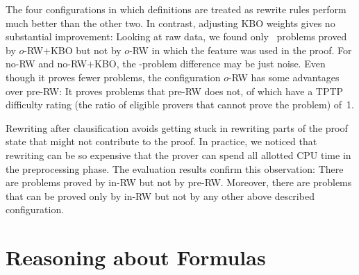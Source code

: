 \newcommand{\unknownres}{\ensuremath{{\varnothing}}}
\newcommand{\colalign}{\phantom{0}}

\begin{figure}[t]
  \centering
  \def\arraystretch{1.1}%
       \label{fig:rewrite}
     \end{figure}



The four configurations in which definitions are treated as rewrite rules
perform much better than the other two. In contrast, adjusting KBO weights gives
no substantial improvement: Looking at raw data, we found only
~problems proved by $o$-RW$+$KBO but not by $o$-RW in which the
feature was used in the proof. For no-RW and no-RW$+$KBO, the
-problem difference may be just noise. Even though it proves fewer
problems, the configuration $o$-RW has some advantages over pre-RW: It proves
 problems that pre-RW does not,  of which have a TPTP
difficulty rating (the ratio of eligible %
provers that cannot prove the problem) of~1.

Rewriting after clausification avoids getting stuck in rewriting parts of the
proof state that might not contribute to the proof. In practice, we noticed that
rewriting can be so expensive that the prover can spend all
allotted CPU time in the preprocessing phase. The evaluation results confirm this
observation: There are  problems proved by in-RW but not by
pre-RW. Moreover, there are  problems that can be proved only
by in-RW but not by any other above described configuration. %


\section{Reasoning about Formulas}
\label{sec:ho-tech:formulas}

